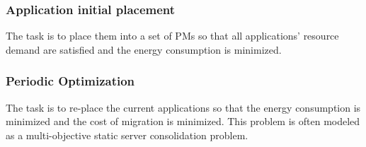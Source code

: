 \subsubsection{Application initial placement}

 The task is to place them into a set of PMs \cite{Mishra:2012kx} so that all applications' resource demand are satisfied and the energy consumption is minimized.



\subsubsection{Periodic Optimization} 

 The task is to re-place the current applications so that the energy consumption is minimized and the cost of migration is minimized. This problem is often modeled as a multi-objective static server consolidation problem. 




